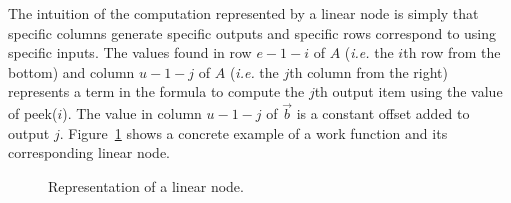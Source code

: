The intuition of the computation represented by a linear node is
simply that specific columns generate specific outputs and specific
rows correspond to using specific inputs.  The values found in row
$e-1-i$ of $A$ ({\it i.e.} the $i$th row from the bottom) and 
column $u-1-j$ of $A$ ({\it i.e.} the $j$th column from the right) 
represents a term in the formula to compute the $j$th output item using 
the value of peek($i$). The value in column $u-1-j$ of 
$\vec{b}$ is a constant offset added to output $j$.
Figure~\ref{fig:linear-node-example} shows a concrete example
of a work function and its corresponding linear node.

\begin{figure}
\center
\epsfxsize=2.9in
\vspace{-8pt}
\caption{Representation of a linear node.}
\vspace{-8pt}
\label{fig:linear-node-example}
\end{figure}
